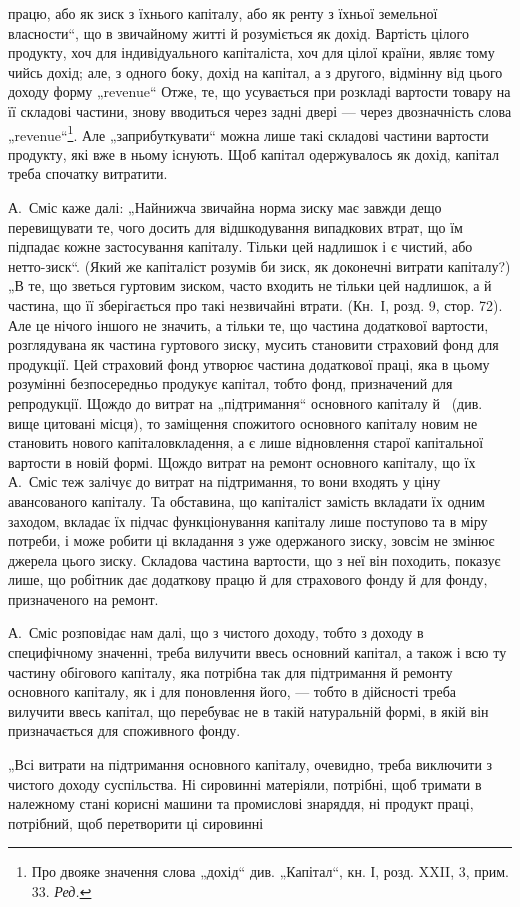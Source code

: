 \parcont{}  %
працю, або як зиск з їхнього капіталу, або як ренту з їхньої земельної
власности“, що в звичайному житті й розуміється як дохід. Вартість
цілого продукту, хоч для індивідуального капіталіста, хоч для цілої країни,
являє тому чийсь дохід; але, з одного боку, дохід на капітал, а з другого,
відмінну від цього доходу форму „revenue“ Отже, те, що усувається при
розкладі вартости товару на її складові частини, знову вводиться через
задні двері — через двозначність слова „revenue“\footnote*{
Про двояке значення слова „дохід“ див. „Капітал“, кн. І, розд. XXII, 3,
прим. 33. \emph{Ред.}
}. Але „заприбуткувати“
можна лише такі складові частини вартости продукту, які вже в ньому
існують. Щоб капітал одержувалось як дохід, капітал треба спочатку
витратити.

А.~Сміс каже далі: „Найнижча звичайна норма зиску має завжди
дещо перевищувати те, чого досить для відшкодування випадкових втрат,
що їм підпадає кожне застосування капіталу. Тільки цей надлишок і є
чистий, або нетто-зиск“. (Який же капіталіст розумів би зиск, як
доконечні витрати капіталу?) „В те, що зветься гуртовим зиском, часто
входить не тільки цей надлишок, а й частина, що її зберігається про
такі незвичайні втрати. (Кн.~І, розд. 9, стор. 72). Але це нічого іншого
не значить, а тільки те, що частина додаткової вартости, розглядувана
як частина гуртового зиску, мусить становити страховий фонд для продукції.
Цей страховий фонд утворює частина додаткової праці, яка в
цьому розумінні безпосередньо продукує капітал, тобто фонд, призначений
для репродукції. Щождо до витрат на „підтримання“ основного
капіталу й~ (див. вище цитовані місця), то заміщення спожитого
основного капіталу новим не становить нового капіталовкладення, а є
лише відновлення старої капітальної вартости в новій формі. Щождо
витрат на ремонт основного капіталу, що їх А.~Сміс теж залічує до витрат
на підтримання, то вони входять у ціну авансованого капіталу.
Та обставина, що капіталіст замість вкладати їх одним заходом, вкладає
їх підчас функціонування капіталу лише поступово та в міру потреби,
і може робити ці вкладання з уже одержаного зиску, зовсім не змінює
джерела цього зиску. Складова частина вартости, що з неї він походить,
показує лише, що робітник дає додаткову працю й для страхового фонду
й для фонду, призначеного на ремонт.

А.~Сміс розповідає нам далі, що з чистого доходу, тобто з доходу в
специфічному значенні, треба вилучити ввесь основний капітал, а також і
всю ту частину обігового капіталу, яка потрібна так для підтримання й
ремонту основного капіталу, як і для поновлення його, — тобто в дійсності
треба вилучити ввесь капітал, що перебуває не в такій натуральній
формі, в якій він призначається для споживного фонду.

„Всі витрати на підтримання основного капіталу, очевидно, треба
виключити з чистого доходу суспільства. Ні сировинні матеріяли, потрібні,
щоб тримати в належному стані корисні машини та промислові
знаряддя, ні продукт праці, потрібний, щоб перетворити ці сировинні
\parbreak{}  %
